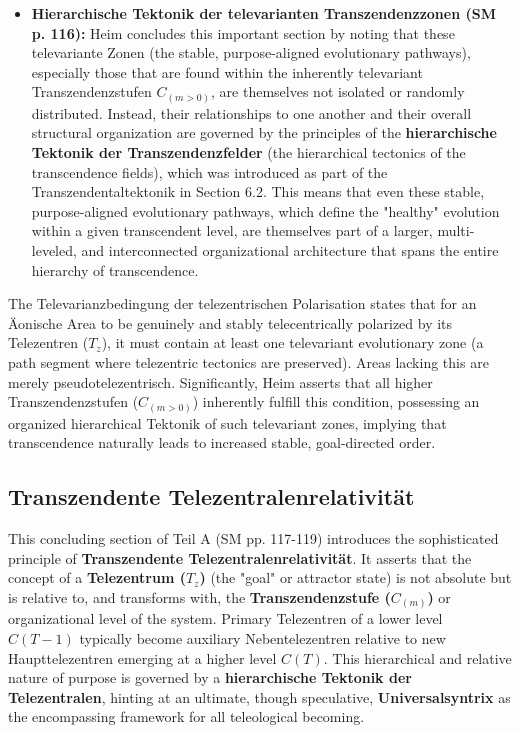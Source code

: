 \documentclass[12pt]{article}
\newcommand{\telezentrum}{T_z}
\begin{document}
\begin{itemize}
    \item \textbf{Hierarchische Tektonik der televarianten Transzendenzzonen (SM p. 116):}
    Heim concludes this important section by noting that these televariante Zonen (the stable, purpose-aligned evolutionary pathways), especially those that are found within the inherently televariant Transzendenzstufen \( C_{(m>0)} \), are themselves not isolated or randomly distributed. Instead, their relationships to one another and their overall structural organization are governed by the principles of the \textbf{hierarchische Tektonik der Transzendenzfelder} (the hierarchical tectonics of the transcendence fields), which was introduced as part of the Transzendentaltektonik in Section 6.2. This means that even these stable, purpose-aligned evolutionary pathways, which define the "healthy" evolution within a given transcendent level, are themselves part of a larger, multi-leveled, and interconnected organizational architecture that spans the entire hierarchy of transcendence.
\end{itemize}

The Televarianzbedingung der telezentrischen Polarisation states that for an Äonische Area to be genuinely and stably telecentrically polarized by its Telezentren (\(\telezentrum\)), it must contain at least one televariant evolutionary zone (a path segment where telezentric tectonics are preserved). Areas lacking this are merely pseudotelezentrisch. Significantly, Heim asserts that all higher Transzendenzstufen (\(C_{(m>0)}\)) inherently fulfill this condition, possessing an organized hierarchical Tektonik of such televariant zones, implying that transcendence naturally leads to increased stable, goal-directed order.

\subsection{Transzendente Telezentralenrelativität}
\label{sec:telezentralenrelativitaet}

This concluding section of Teil A (SM pp. 117-119) introduces the sophisticated principle of \textbf{Transzendente Telezentralenrelativität}. It asserts that the concept of a \textbf{Telezentrum (\(\telezentrum\))} (the "goal" or attractor state) is not absolute but is relative to, and transforms with, the \textbf{Transzendenzstufe (\(C_{(m)}\))} or organizational level of the system. Primary Telezentren of a lower level \(C(T-1)\) typically become auxiliary Nebentelezentren relative to new Haupttelezentren emerging at a higher level \(C(T)\). This hierarchical and relative nature of purpose is governed by a \textbf{hierarchische Tektonik der Telezentralen}, hinting at an ultimate, though speculative, \textbf{Universalsyntrix} as the encompassing framework for all teleological becoming.
\end{document}
